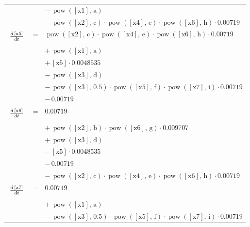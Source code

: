 \documentclass{article}
\begin{document}
\begin{longtable}{lll}
 & & $ - \, \operatorname{pow}\left(\left[\mathrm{x1}\right],\,\mathrm{a}\right) $\\
 & & $ - \, \operatorname{pow}\left(\left[\mathrm{x2}\right],\,\mathrm{c}\right) \cdot \operatorname{pow}\left(\left[\mathrm{x4}\right],\,\mathrm{e}\right) \cdot \operatorname{pow}\left(\left[\mathrm{x6}\right],\,\mathrm{h}\right) \cdot 0.00719 $\\[5mm]
$ \tabfrac{d\,\left[\mathrm{x5}\right]}{dt} $ &=& $ \operatorname{pow}\left(\left[\mathrm{x2}\right],\,\mathrm{c}\right) \cdot \operatorname{pow}\left(\left[\mathrm{x4}\right],\,\mathrm{e}\right) \cdot \operatorname{pow}\left(\left[\mathrm{x6}\right],\,\mathrm{h}\right) \cdot 0.00719 $\\
 & & $ + \, \operatorname{pow}\left(\left[\mathrm{x1}\right],\,\mathrm{a}\right) $\\
 & & $ + \, \left[\mathrm{x5}\right] \cdot 0.0048535 $\\
 & & $ - \, \operatorname{pow}\left(\left[\mathrm{x3}\right],\,\mathrm{d}\right) $\\
 & & $ - \, \operatorname{pow}\left(\left[\mathrm{x3}\right],\,0.5\right) \cdot \operatorname{pow}\left(\left[\mathrm{x5}\right],\,\mathrm{f}\right) \cdot \operatorname{pow}\left(\left[\mathrm{x7}\right],\,\mathrm{i}\right) \cdot 0.00719 $\\
 & & $ - \, 0.00719 $\\[5mm]
$ \tabfrac{d\,\left[\mathrm{x6}\right]}{dt} $ &=& $ 0.00719 $\\
 & & $ + \, \operatorname{pow}\left(\left[\mathrm{x2}\right],\,\mathrm{b}\right) \cdot \operatorname{pow}\left(\left[\mathrm{x6}\right],\,\mathrm{g}\right) \cdot 0.009707 $\\
 & & $ + \, \operatorname{pow}\left(\left[\mathrm{x3}\right],\,\mathrm{d}\right) $\\
 & & $ - \, \left[\mathrm{x5}\right] \cdot 0.0048535 $\\
 & & $ - \, 0.00719 $\\
 & & $ - \, \operatorname{pow}\left(\left[\mathrm{x2}\right],\,\mathrm{c}\right) \cdot \operatorname{pow}\left(\left[\mathrm{x4}\right],\,\mathrm{e}\right) \cdot \operatorname{pow}\left(\left[\mathrm{x6}\right],\,\mathrm{h}\right) \cdot 0.00719 $\\[5mm]
$ \tabfrac{d\,\left[\mathrm{x7}\right]}{dt} $ &=& $ 0.00719 $\\
 & & $ + \, \operatorname{pow}\left(\left[\mathrm{x1}\right],\,\mathrm{a}\right) $\\
 & & $ - \, \operatorname{pow}\left(\left[\mathrm{x3}\right],\,0.5\right) \cdot \operatorname{pow}\left(\left[\mathrm{x5}\right],\,\mathrm{f}\right) \cdot \operatorname{pow}\left(\left[\mathrm{x7}\right],\,\mathrm{i}\right) \cdot 0.00719 $\\[5mm]
\end{longtable}
\end{document}
